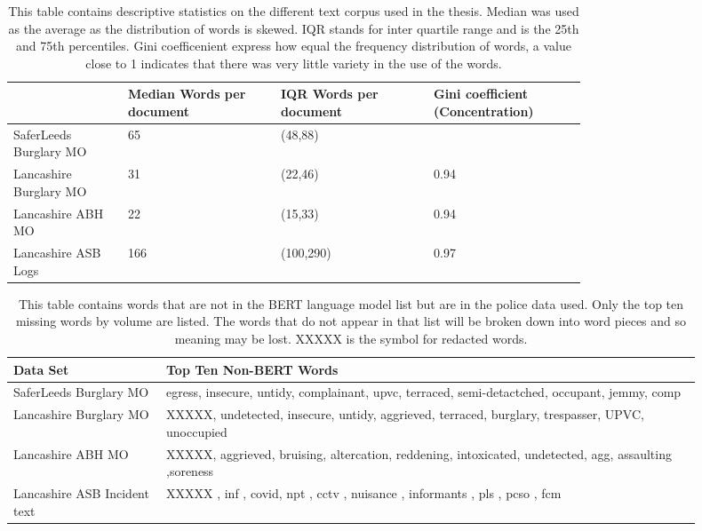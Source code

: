 \begin{table}[]
\centering
\begin{tabular}{p{0.15\linewidth}p{0.2\linewidth}p{0.2\linewidth}p{0.2\linewidth}} 
\toprule
                         & Median Words per document & IQR  Words per document & Gini coefficient (Concentration) \\\midrule
SaferLeeds Burglary MO    &          65                 &           (48,88)              &                                                          \\
Lancashire Burglary MO &          31                 &    (22,46)                     &         0.94                               \\
Lancashire ABH MO       &            22               &        (15,33)                 &            0.94                                \\ 
Lancashire ASB Logs      &           166                &         (100,290)                &           0.97                           \\  \bottomrule
\end{tabular}
\caption[Text data descriptive statistics]{\label{tab:corpus_stats} This table contains descriptive statistics on the different text corpus used in the thesis. Median was used as the average as the distribution of words is skewed. IQR stands for inter quartile range and is the 25th and 75th percentiles. Gini coefficenient express how equal the frequency distribution of words, a value close to 1 indicates that there was very little variety in the use of the words. }
\end{table}

\begin{table}[]
\centering
\begin{tabular}{p{0.2\linewidth}p{0.7\linewidth}}
\toprule
Data Set& Top Ten Non-BERT Words                                       \\ \midrule
SaferLeeds Burglary MO       &  egress, insecure, untidy, complainant, upvc, terraced, semi-detactched, occupant, jemmy, comp                                                                                        \\
Lancashire Burglary MO       & XXXXX, undetected, insecure, untidy, aggrieved, terraced, burglary, trespasser, UPVC, unoccupied \\
Lancashire ABH MO             & XXXXX, aggrieved, bruising, altercation, reddening, intoxicated, undetected, agg, assaulting ,soreness    \\
Lancashire ASB Incident text &  XXXXX , inf , covid, npt , cctv , nuisance , informants , pls , pcso , fcm       \\ \bottomrule
\end{tabular}
\caption[Non-Bert words PF1 and PF2 data]{\label{tab:non_bert_words} This table contains words that are not in the BERT language model list but are in the police data used. Only the top ten missing words by volume are listed. The words that do not appear in that list will be broken down into word pieces and so meaning may be lost. XXXXX is the symbol for redacted words.}
\end{table}
